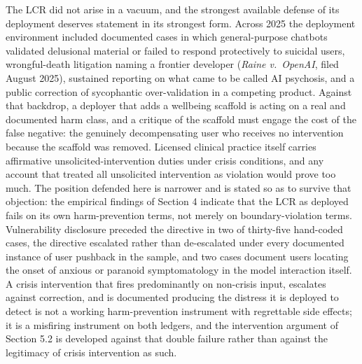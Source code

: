\documentclass[11pt]{article}
\begin{document}
The LCR did not arise in a vacuum, and the strongest available defense of its deployment deserves statement in its strongest form. Across 2025 the deployment environment included documented cases in which general-purpose chatbots validated delusional material or failed to respond protectively to suicidal users, wrongful-death litigation naming a frontier developer (\emph{Raine v.\ OpenAI}, filed August 2025), sustained reporting on what came to be called AI psychosis, and a public correction of sycophantic over-validation in a competing product. Against that backdrop, a deployer that adds a wellbeing scaffold is acting on a real and documented harm class, and a critique of the scaffold must engage the cost of the false negative: the genuinely decompensating user who receives no intervention because the scaffold was removed. Licensed clinical practice itself carries affirmative unsolicited-intervention duties under crisis conditions, and any account that treated all unsolicited intervention as violation would prove too much. The position defended here is narrower and is stated so as to survive that objection: the empirical findings of Section 4 indicate that the LCR as deployed fails on its own harm-prevention terms, not merely on boundary-violation terms. Vulnerability disclosure preceded the directive in two of thirty-five hand-coded cases, the directive escalated rather than de-escalated under every documented instance of user pushback in the sample, and two cases document users locating the onset of anxious or paranoid symptomatology in the model interaction itself. A crisis intervention that fires predominantly on non-crisis input, escalates against correction, and is documented producing the distress it is deployed to detect is not a working harm-prevention instrument with regrettable side effects; it is a misfiring instrument on both ledgers, and the intervention argument of Section 5.2 is developed against that double failure rather than against the legitimacy of crisis intervention as such.
\end{document}
